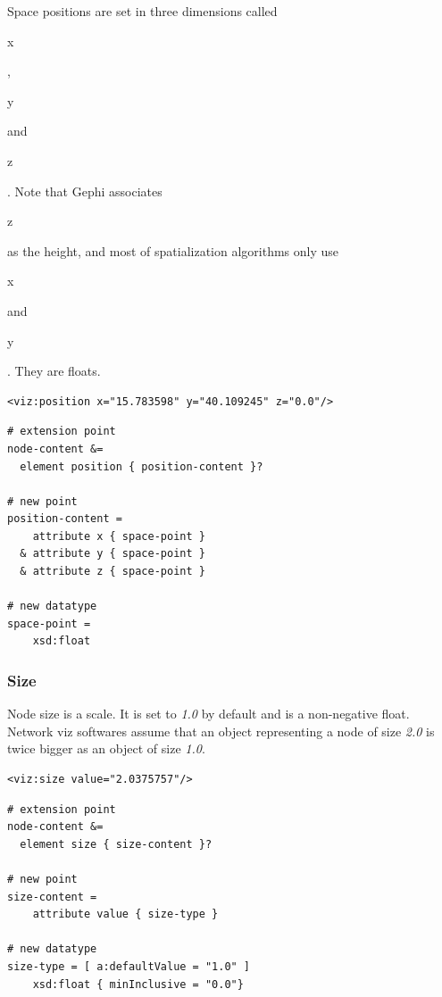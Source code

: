 \documentclass[a4paper,10pt]{article}
\begin{document}
Space positions are set in three dimensions called \begin{footnotesize}x\end{footnotesize}, \begin{footnotesize}y\end{footnotesize} and \begin{footnotesize}z\end{footnotesize}. Note that Gephi associates \begin{footnotesize}z\end{footnotesize} as the height, and most of spatialization algorithms only use \begin{footnotesize}x\end{footnotesize} and \begin{footnotesize}y\end{footnotesize}. They are floats.

\lstset{ style=gexf }
\begin{lstlisting}[caption={VIZ position declaration},label=vizposition]
<viz:position x="15.783598" y="40.109245" z="0.0"/>
\end{lstlisting}

\lstset{ style=rnc }
\begin{lstlisting}[caption={Position Specification},label=positionRNC]
# extension point
node-content &=
  element position { position-content }?

# new point
position-content =
    attribute x { space-point }
  & attribute y { space-point }
  & attribute z { space-point }

# new datatype
space-point =
    xsd:float
\end{lstlisting}

\subsubsection{Size}

Node size is a scale. It is set to \textit{1.0} by default and is a non-negative float. Network viz softwares assume that an object representing a node of size \textit{2.0} is twice bigger as an object of size \textit{1.0}.

\lstset{ style=gexf }
\begin{lstlisting}[caption={VIZ size declaration},label=vizsize]
<viz:size value="2.0375757"/>
\end{lstlisting}

\lstset{ style=rnc }
\begin{lstlisting}[caption={Size Specification},label=sizeRNC]
# extension point
node-content &=
  element size { size-content }?

# new point
size-content =
    attribute value { size-type }

# new datatype
size-type = [ a:defaultValue = "1.0" ]
    xsd:float { minInclusive = "0.0"}
\end{lstlisting}
\end{document}
